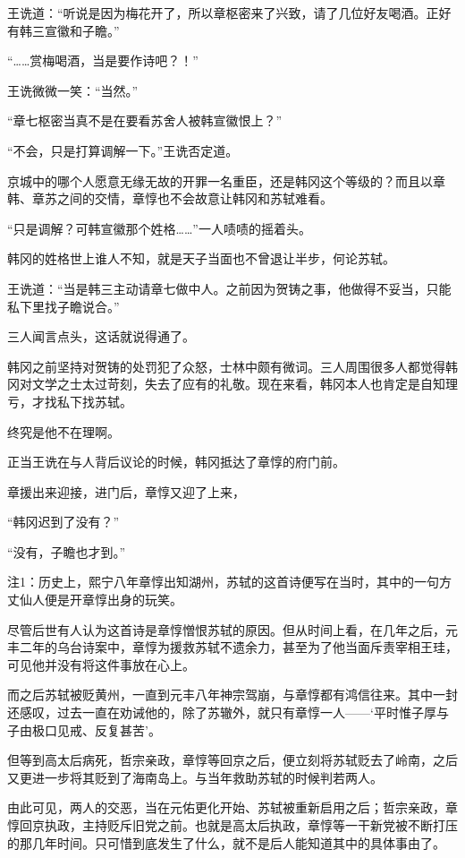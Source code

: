 王诜道：“听说是因为梅花开了，所以章枢密来了兴致，请了几位好友喝酒。正好有韩三宣徽和子瞻。”

“……赏梅喝酒，当是要作诗吧？！”

王诜微微一笑：“当然。”

“章七枢密当真不是在要看苏舍人被韩宣徽恨上？”

“不会，只是打算调解一下。”王诜否定道。

京城中的哪个人愿意无缘无故的开罪一名重臣，还是韩冈这个等级的？而且以章韩、章苏之间的交情，章惇也不会故意让韩冈和苏轼难看。

“只是调解？可韩宣徽那个姓格……”一人啧啧的摇着头。

韩冈的姓格世上谁人不知，就是天子当面也不曾退让半步，何论苏轼。

王诜道：“当是韩三主动请章七做中人。之前因为贺铸之事，他做得不妥当，只能私下里找子瞻说合。”

三人闻言点头，这话就说得通了。

韩冈之前坚持对贺铸的处罚犯了众怒，士林中颇有微词。三人周围很多人都觉得韩冈对文学之士太过苛刻，失去了应有的礼敬。现在来看，韩冈本人也肯定是自知理亏，才找私下找苏轼。

终究是他不在理啊。

正当王诜在与人背后议论的时候，韩冈抵达了章惇的府门前。

章援出来迎接，进门后，章惇又迎了上来，

“韩冈迟到了没有？”

“没有，子瞻也才到。”

注1：历史上，熙宁八年章惇出知湖州，苏轼的这首诗便写在当时，其中的一句方丈仙人便是开章惇出身的玩笑。

尽管后世有人认为这首诗是章惇憎恨苏轼的原因。但从时间上看，在几年之后，元丰二年的乌台诗案中，章惇为援救苏轼不遗余力，甚至为了他当面斥责宰相王珪，可见他并没有将这件事放在心上。

而之后苏轼被贬黄州，一直到元丰八年神宗驾崩，与章惇都有鸿信往来。其中一封还感叹，过去一直在劝诫他的，除了苏辙外，就只有章惇一人——‘平时惟子厚与子由极口见戒、反复甚苦’。

但等到高太后病死，哲宗亲政，章惇等回京之后，便立刻将苏轼贬去了岭南，之后又更进一步将其贬到了海南岛上。与当年救助苏轼的时候判若两人。

由此可见，两人的交恶，当在元佑更化开始、苏轼被重新启用之后；哲宗亲政，章惇回京执政，主持贬斥旧党之前。也就是高太后执政，章惇等一干新党被不断打压的那几年时间。只可惜到底发生了什么，就不是后人能知道其中的具体事由了。

